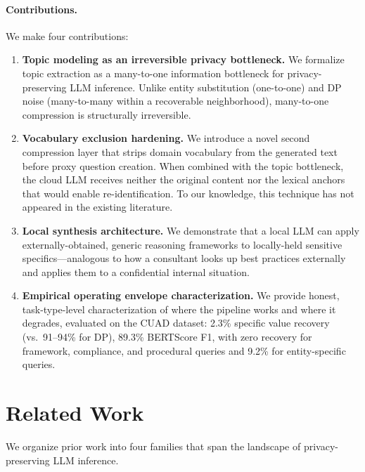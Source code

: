 \documentclass[sigconf,anonymous,review,balance=false]{acmart}
\begin{document}
\paragraph{Contributions.} We make four contributions:

\begin{enumerate}
\item \textbf{Topic modeling as an irreversible privacy bottleneck.} We formalize topic extraction as a many-to-one information bottleneck for privacy-preserving LLM inference. Unlike entity substitution (one-to-one) and DP noise (many-to-many within a recoverable neighborhood), many-to-one compression is structurally irreversible.

\item \textbf{Vocabulary exclusion hardening.} We introduce a novel second compression layer that strips domain vocabulary from the generated text before proxy question creation. When combined with the topic bottleneck, the cloud LLM receives neither the original content nor the lexical anchors that would enable re-identification. To our knowledge, this technique has not appeared in the existing literature.

\item \textbf{Local synthesis architecture.} We demonstrate that a local LLM can apply externally-obtained, generic reasoning frameworks to locally-held sensitive specifics---analogous to how a consultant looks up best practices externally and applies them to a confidential internal situation.

\item \textbf{Empirical operating envelope characterization.} We provide honest, task-type-level characterization of where the pipeline works and where it degrades, evaluated on the CUAD dataset: 2.3\% specific value recovery (vs.\ 91--94\% for DP), 89.3\% BERTScore F1, with zero recovery for framework, compliance, and procedural queries and 9.2\% for entity-specific queries.
\end{enumerate}

\section{Related Work}
\label{sec:related}

We organize prior work into four families that span the landscape of privacy-preserving LLM inference.
\end{document}
